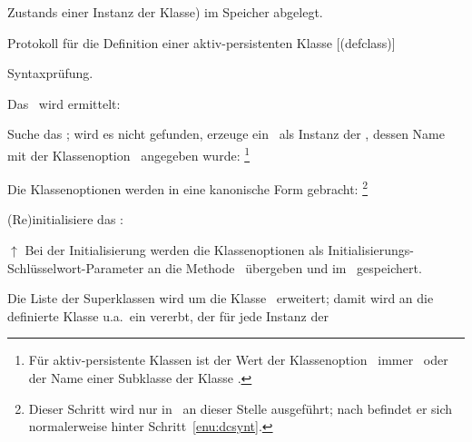 Zustands einer Instanz der Klasse) im Speicher abgelegt.
%
\def\addeditemchar{%
{\usefont{U}{pzd}{m}{n}\char58}%
}%
%
\def\lwclitemchar{%
{\usefont{U}{pzd}{m}{n}\char54}%
}%
%
\def\plobmtdchar{$\uparrow$}%
%
\def\addeditem{~\hfill{\small\addeditemchar}}
\def\lwclitem{~\hfill{\small\lwclitemchar}}
%
\begin{infol}
%
\captionfrom%
 {Protokoll f\"{u}r die Definition einer aktiv-persistenten Klasse}%
 {\cite[]{bib:pa91b}}%
 [(defclass)]%
 \label{pro:defclass}%
\nopagebreak[4]%
%
\item\label{enu:dcsynt} Syntaxpr\"{u}fung.
%
\item Das \clsmo\ wird ermittelt:\\
%
\begin{block}
%
\item Suche das \clsmo; wird es nicht gefunden, erzeuge ein
\clsmo\ als Instanz der \clsmc, dessen Name mit der Klassenoption
\ angegeben wurde:%
\footnote{F\"{u}r aktiv-persistente Klassen ist der Wert der
Klassenoption \ immer
\ oder der Name einer Subklasse der Klasse
.}\\
%
\item Die Klassenoptionen werden in eine kanonische Form gebracht:%
\footnote{Dieser Schritt wird nur in \lw\ an dieser Stelle
ausgef\"{u}hrt; nach \cite[]{bib:pa91b} befindet er sich
normalerweise hinter Schritt~\ref{enu:dcsynt}.}%
\lwclitem\\
%
\item\label{enu:dcinit} (Re)initialisiere das \clsmo:\\
\item[\plobmtdchar] Bei der Initialisierung werden die Klassenoptionen
als Ini\-tia\-li\-sie\-rungs-Schl\"{u}s\-sel\-wort-Pa\-ra\-me\-ter an die
Methode \ \"{u}bergeben und im
\clsmo\ gespeichert.
\par{}Die Liste der Superklassen wird um die Klasse
\ erweitert; damit wird an die
definierte Klasse u.a.\ ein \Slt\/ vererbt, der f\"{u}r jede Instanz der

\end{block}
\end{infol}
